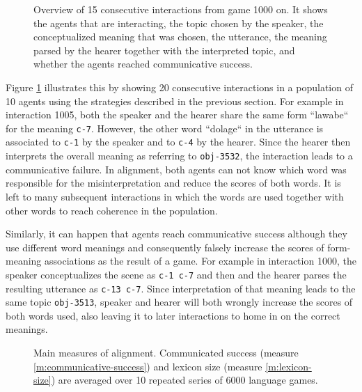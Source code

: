 \begin{figure}[p]
  \caption{Overview of 15 consecutive interactions from game 1000
    on. It shows the agents that are interacting, the topic chosen by
    the speaker, the conceptualized meaning that was chosen, the
    utterance, the meaning parsed by the hearer together with the
    interpreted topic, and whether the agents reached communicative
    success.}
  \label{f:sgg-mw-unstructured-trace}
\end{figure}

Figure \ref{f:sgg-mw-unstructured-trace} illustrates this by showing
20 consecutive interactions in a population of 10 agents using the
strategies described in the previous section. For example in
interaction 1005, both the speaker and the hearer share the same form
``lawabe`` for the meaning \texttt{c-7}. However, the other word
``dolage`` in the utterance is associated to \texttt{c-1} by the
speaker and to \texttt{c-4} by the hearer. Since the hearer then
interprets the overall meaning as referring to \texttt{obj-3532}, the
interaction leads to a communicative failure. In alignment, both
agents can not know which word was responsible for the
misinterpretation and reduce the scores of both words. It is left to
many subsequent interactions in which the words are used together with
other words to reach coherence in the population.

Similarly, it can happen that agents reach communicative success
although they use different word meanings and consequently falsely
increase the scores of form-meaning associations as the result of a
game. For example in interaction 1000, the speaker conceptualizes the
scene as \texttt{c-1 c-7} and then and the hearer parses the resulting
utterance as \texttt{c-13 c-7}. Since interpretation of that meaning
leads to the same topic \texttt{obj-3513}, speaker and hearer will
both wrongly increase the scores of both words used, also leaving it
to later interactions to home in on the correct meanings.


\startfiguregroup

\begin{figure}[t]
  \caption{Main measures of alignment. Communicated success (measure
    \ref{m:communicative-success}) and lexicon size (measure
    \ref{m:lexicon-size}) are averaged over 10 repeated series of 6000
    language games.}
  \label{f:sgg-mw-unstructured-success+lexicon-size}
\end{figure}


